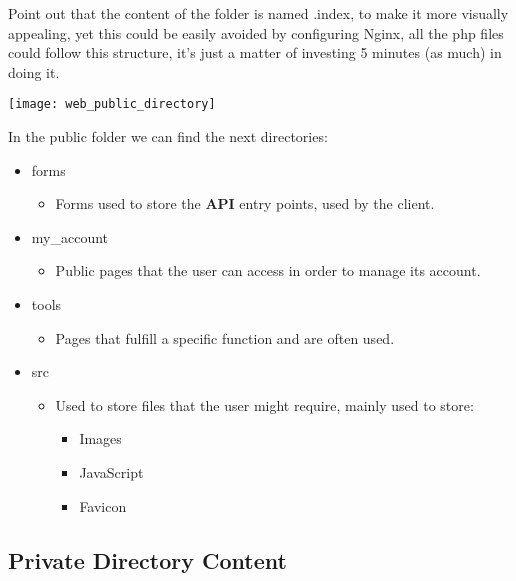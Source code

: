 \begin{flushleft}
    Point out that the content of the folder is named .index, to make it more visually appealing, yet this could be
    easily avoided by configuring Nginx, all the php files could follow this structure, it's just a matter of investing
    5 minutes (as much) in doing it.
\end{flushleft}
\begin{center}
    \texttt{[image: web\_public\_directory]}
\end{center}
In the public folder we can find the next directories:
\begin{itemize}
    \item forms
    \begin{itemize}
        \item Forms used to store the \textbf{API} entry points, used by the client.
    \end{itemize}
    \item my\_account
    \begin{itemize}
        \item Public pages that the user can access in order to manage its account.
    \end{itemize}
    \item tools
    \begin{itemize}
        \item Pages that fulfill a specific function and are often used.
    \end{itemize}
    \item src
    \begin{itemize}
        \item Used to store files that the user might require, mainly used to store:
        \begin{itemize}
            \item Images
            \item JavaScript
            \item Favicon
        \end{itemize}
    \end{itemize}
\end{itemize}
\newpage

\subsection{Private Directory Content}\label{subsec:private-directory-content}
